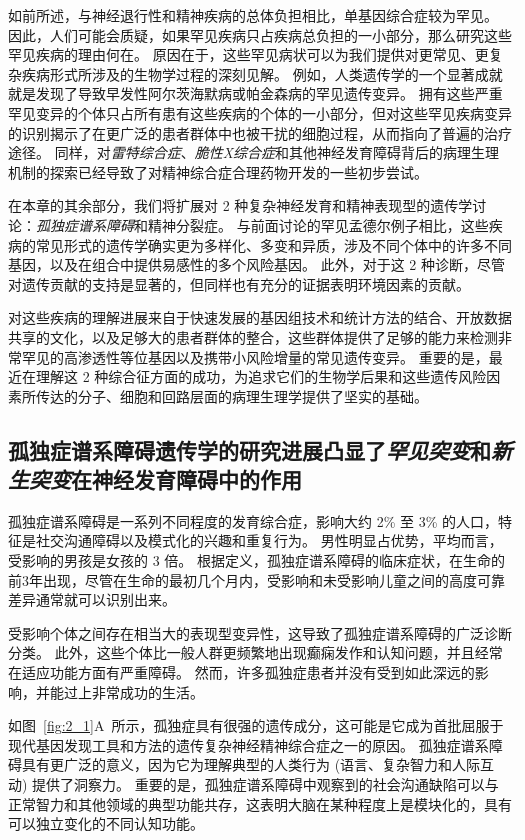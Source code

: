 如前所述，与神经退行性和精神疾病的总体负担相比，单基因综合症较为罕见。
因此，人们可能会质疑，如果罕见疾病只占疾病总负担的一小部分，那么研究这些罕见疾病的理由何在。
原因在于，这些罕见病状可以为我们提供对更常见、更复杂疾病形式所涉及的生物学过程的深刻见解。
例如，人类遗传学的一个显著成就就是发现了导致早发性阿尔茨海默病或帕金森病的罕见遗传变异。
拥有这些严重罕见变异的个体只占所有患有这些疾病的个体的一小部分，但对这些罕见疾病变异的识别揭示了在更广泛的患者群体中也被干扰的细胞过程，从而指向了普遍的治疗途径。
同样，对\textit{雷特综合症}、\textit{脆性X综合症}和其他神经发育障碍背后的病理生理机制的探索已经导致了对精神综合症合理药物开发的一些初步尝试。


在本章的其余部分，我们将扩展对 2 种复杂神经发育和精神表现型的遗传学讨论：\textit{孤独症谱系障碍}和精神分裂症。
与前面讨论的罕见孟德尔例子相比，这些疾病的常见形式的遗传学确实更为多样化、多变和异质，涉及不同个体中的许多不同基因，以及在组合中提供易感性的多个风险基因。
此外，对于这 2 种诊断，尽管对遗传贡献的支持是显著的，但同样也有充分的证据表明环境因素的贡献。


对这些疾病的理解进展来自于快速发展的基因组技术和统计方法的结合、开放数据共享的文化，以及足够大的患者群体的整合，这些群体提供了足够的能力来检测非常罕见的高渗透性等位基因以及携带小风险增量的常见遗传变异。
重要的是，最近在理解这 2 种综合征方面的成功，为追求它们的生物学后果和这些遗传风险因素所传达的分子、细胞和回路层面的病理生理学提供了坚实的基础。




\subsection{孤独症谱系障碍遗传学的研究进展凸显了\textit{罕见突变}和\textit{新生突变}在神经发育障碍中的作用}

孤独症谱系障碍是一系列不同程度的发育综合症，影响大约 2\% 至 3\% 的人口，特征是社交沟通障碍以及模式化的兴趣和重复行为。
男性明显占优势，平均而言，受影响的男孩是女孩的 3 倍。
根据定义，孤独症谱系障碍的临床症状，在生命的前3年出现，尽管在生命的最初几个月内，受影响和未受影响儿童之间的高度可靠差异通常就可以识别出来。



受影响个体之间存在相当大的表现型变异性，这导致了孤独症谱系障碍的广泛诊断分类。
此外，这些个体比一般人群更频繁地出现癫痫发作和认知问题，并且经常在适应功能方面有严重障碍。
然而，许多孤独症患者并没有受到如此深远的影响，并能过上非常成功的生活。



如图~\ref{fig:2_1}A~所示，孤独症具有很强的遗传成分，这可能是它成为首批屈服于现代基因发现工具和方法的遗传复杂神经精神综合症之一的原因。
孤独症谱系障碍具有更广泛的意义，因为它为理解典型的人类行为 (语言、复杂智力和人际互动) 提供了洞察力。
重要的是，孤独症谱系障碍中观察到的社会沟通缺陷可以与正常智力和其他领域的典型功能共存，这表明大脑在某种程度上是模块化的，具有可以独立变化的不同认知功能。


